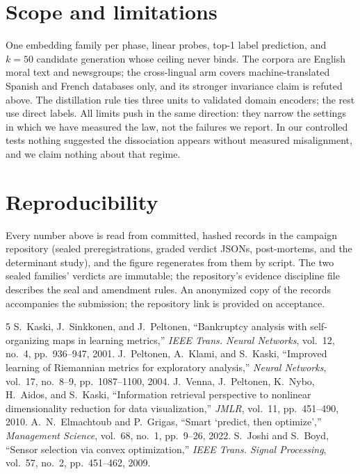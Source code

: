 \documentclass{article}
\begin{document}
\section{Scope and limitations}

One embedding family per phase, linear probes, top-1 label prediction, and
$k=50$ candidate generation whose ceiling never binds. The corpora are
English moral text and newsgroups; the cross-lingual arm covers
machine-translated Spanish and French databases only, and its stronger
invariance claim is refuted above. The distillation rule ties three units to
validated domain encoders; the rest use direct labels. All limits push in
the same direction: they narrow the settings in which we have measured the
law, not the failures we report. In our controlled tests nothing
suggested the dissociation appears without measured misalignment, and we
claim nothing about that regime.

\section*{Reproducibility}

Every number above is read from committed, hashed records in the campaign
repository (sealed preregistrations, graded verdict JSONs, post-mortems, and
the determinant study), and the figure regenerates from them by script. The
two sealed families' verdicts are immutable; the repository's evidence
discipline file describes the seal and amendment rules. An anonymized copy of the records accompanies the submission; the repository link is provided on acceptance.

\begin{thebibliography}{5}
 S.~Kaski, J.~Sinkkonen, and J.~Peltonen,
``Bankruptcy analysis with self-organizing maps in learning metrics,''
\emph{IEEE Trans. Neural Networks}, vol.~12, no.~4, pp.~936--947, 2001.
 J.~Peltonen, A.~Klami, and S.~Kaski,
``Improved learning of Riemannian metrics for exploratory analysis,''
\emph{Neural Networks}, vol.~17, no.~8--9, pp.~1087--1100, 2004.
 J.~Venna, J.~Peltonen, K.~Nybo, H.~Aidos, and S.~Kaski,
``Information retrieval perspective to nonlinear dimensionality reduction for
data visualization,'' \emph{JMLR}, vol.~11, pp.~451--490, 2010.
 A.~N.~Elmachtoub and P.~Grigas, ``Smart `predict,
then optimize','' \emph{Management Science}, vol.~68, no.~1, pp.~9--26, 2022.
 S.~Joshi and S.~Boyd, ``Sensor selection via convex
optimization,'' \emph{IEEE Trans. Signal Processing}, vol.~57, no.~2,
pp.~451--462, 2009.
\end{thebibliography}
\end{document}
